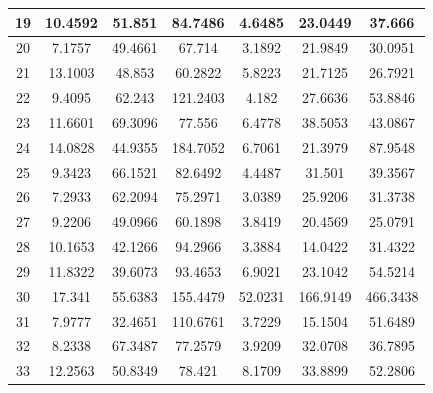 \documentclass[12pt]{article}
\begin{document}
\begin{table}[htbp]
{\begin{tabular}{|c|ccc|ccc|}
				19        & \multicolumn{1}{c|}{10.4592} & \multicolumn{1}{c|}{51.851}  & 84.7486  & \multicolumn{1}{c|}{4.6485}  & \multicolumn{1}{c|}{23.0449}  & 37.666   \\ \hline
				20        & \multicolumn{1}{c|}{7.1757}  & \multicolumn{1}{c|}{49.4661} & 67.714   & \multicolumn{1}{c|}{3.1892}  & \multicolumn{1}{c|}{21.9849}  & 30.0951  \\ \hline
				21        & \multicolumn{1}{c|}{13.1003} & \multicolumn{1}{c|}{48.853}  & 60.2822  & \multicolumn{1}{c|}{5.8223}  & \multicolumn{1}{c|}{21.7125}  & 26.7921  \\ \hline
				22        & \multicolumn{1}{c|}{9.4095}  & \multicolumn{1}{c|}{62.243}  & 121.2403 & \multicolumn{1}{c|}{4.182}   & \multicolumn{1}{c|}{27.6636}  & 53.8846  \\ \hline
				23        & \multicolumn{1}{c|}{11.6601} & \multicolumn{1}{c|}{69.3096} & 77.556   & \multicolumn{1}{c|}{6.4778}  & \multicolumn{1}{c|}{38.5053}  & 43.0867  \\ \hline
				24        & \multicolumn{1}{c|}{14.0828} & \multicolumn{1}{c|}{44.9355} & 184.7052 & \multicolumn{1}{c|}{6.7061}  & \multicolumn{1}{c|}{21.3979}  & 87.9548  \\ \hline
				25        & \multicolumn{1}{c|}{9.3423}  & \multicolumn{1}{c|}{66.1521} & 82.6492  & \multicolumn{1}{c|}{4.4487}  & \multicolumn{1}{c|}{31.501}   & 39.3567  \\ \hline
				26        & \multicolumn{1}{c|}{7.2933}  & \multicolumn{1}{c|}{62.2094} & 75.2971  & \multicolumn{1}{c|}{3.0389}  & \multicolumn{1}{c|}{25.9206}  & 31.3738  \\ \hline
				27        & \multicolumn{1}{c|}{9.2206}  & \multicolumn{1}{c|}{49.0966} & 60.1898  & \multicolumn{1}{c|}{3.8419}  & \multicolumn{1}{c|}{20.4569}  & 25.0791  \\ \hline
				28        & \multicolumn{1}{c|}{10.1653} & \multicolumn{1}{c|}{42.1266} & 94.2966  & \multicolumn{1}{c|}{3.3884}  & \multicolumn{1}{c|}{14.0422}  & 31.4322  \\ \hline
				29        & \multicolumn{1}{c|}{11.8322} & \multicolumn{1}{c|}{39.6073} & 93.4653  & \multicolumn{1}{c|}{6.9021}  & \multicolumn{1}{c|}{23.1042}  & 54.5214  \\ \hline
				30        & \multicolumn{1}{c|}{17.341}  & \multicolumn{1}{c|}{55.6383} & 155.4479 & \multicolumn{1}{c|}{52.0231} & \multicolumn{1}{c|}{166.9149} & 466.3438 \\ \hline
				31        & \multicolumn{1}{c|}{7.9777}  & \multicolumn{1}{c|}{32.4651} & 110.6761 & \multicolumn{1}{c|}{3.7229}  & \multicolumn{1}{c|}{15.1504}  & 51.6489  \\ \hline
				32        & \multicolumn{1}{c|}{8.2338}  & \multicolumn{1}{c|}{67.3487} & 77.2579  & \multicolumn{1}{c|}{3.9209}  & \multicolumn{1}{c|}{32.0708}  & 36.7895  \\ \hline
				33        & \multicolumn{1}{c|}{12.2563} & \multicolumn{1}{c|}{50.8349} & 78.421   & \multicolumn{1}{c|}{8.1709}  & \multicolumn{1}{c|}{33.8899}  & 52.2806  \\ \hline
			\end{tabular}%
		}
	\end{table}
	
\end{document}
